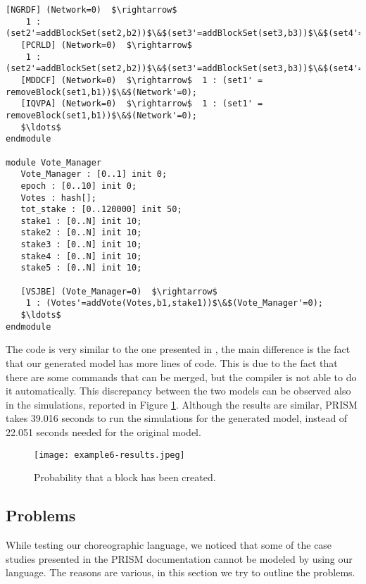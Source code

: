 \begin{lstlisting}[style=prism-color,caption={Generated PRISM program for the Hybrid Casper	Protocol.},captionpos=b,label={ex5-gen}]
   [NGRDF] (Network=0)  $\rightarrow$  
   	1 : (set2'=addBlockSet(set2,b2))$\&$(set3'=addBlockSet(set3,b3))$\&$(set4'=addBlockSet(set4,b4))$\&$(set5'=addBlockSet(set5,b5))$\&$(Network'=0); 
   [PCRLD] (Network=0)  $\rightarrow$  
   	1 : (set2'=addBlockSet(set2,b2))$\&$(set3'=addBlockSet(set3,b3))$\&$(set4'=addBlockSet(set4,b4))$\&$(set5'=addBlockSet(set5,b5))$\&$(Network'=0); 
   [MDDCF] (Network=0)  $\rightarrow$  1 : (set1' = removeBlock(set1,b1))$\&$(Network'=0); 
   [IQVPA] (Network=0)  $\rightarrow$  1 : (set1' = removeBlock(set1,b1))$\&$(Network'=0); 
   $\ldots$
endmodule

module Vote_Manager
   Vote_Manager : [0..1] init 0;
   epoch : [0..10] init 0;
   Votes : hash[];  
   tot_stake : [0..120000] init 50; 
   stake1 : [0..N] init 10; 
   stake2 : [0..N] init 10; 
   stake3 : [0..N] init 10; 
   stake4 : [0..N] init 10; 
   stake5 : [0..N] init 10; 

   [VSJBE] (Vote_Manager=0)  $\rightarrow$  
   	1 : (Votes'=addVote(Votes,b1,stake1))$\&$(Vote_Manager'=0); 
   $\ldots$
endmodule

\end{lstlisting}

The code is very similar to the one presented in \cite{DBLP:journals/distribledger/GallettaLMV23},
the main difference is the fact that our generated model has more lines of code.
This is due to the fact that there are some commands that can be merged, but the compiler is not able to do it automatically.
This discrepancy between the two models can be observed also in the simulations, reported in Figure \ref{ex5-res}.
Although the results are similar, PRISM takes 39.016 seconds to run the simulations for the generated model, 
instead of 22.051 seconds needed for the original model.

\begin{figure}[h]
\centering
\texttt{[image: example6-results.jpeg]}	
\caption{Probability that a block has been created.}
\label{ex5-res}
\end{figure}


\subsection{Problems}
While testing our choreographic language, we noticed that some of the case studies presented in the 
PRISM documentation \cite{PRISMdoc} cannot be modeled by using our language.
The reasons are various, in this section we try to outline the problems.

